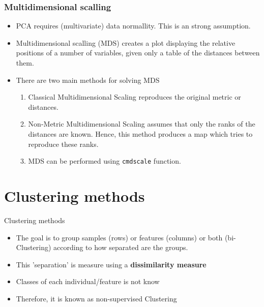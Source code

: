 \documentclass[10pt,xcolor=dvipsnames]{beamer}\usepackage[]{graphicx}\usepackage[]{color}
\begin{document}
\begin{frame}[plain]\frametitle{Multidimensional scalling}

\begin{itemize}
\item PCA requires (multivariate) data normallity. This is an strong assumption.
\item Multidimensional scalling (MDS) creates a plot displaying the relative positions of a number of 
variables, given only a table of the distances between them.
\item There are two main methods for solving MDS
\begin{enumerate}
\item Classical Multidimensional Scaling reproduces the original metric or distances. 
\item Non-Metric Multidimensional Scaling assumes that only the ranks of the distances are known. Hence, this method produces a map which tries to reproduce these ranks. 
\item  MDS can be performed using {\tt cmdscale} function.
 \end{enumerate}
\end{itemize}
\end{frame}





\section{Clustering methods}


\begin{frame}{Clustering methods}

\begin{itemize}
 \item The goal is to group samples (rows) or features (columns) or both (bi-Clustering)
  according to how separated are the groups.
 \item This 'separation' is measure using a \textbf{dissimilarity measure}
 \item Classes of each individual/feature is not know
 \item Therefore, it is known as non-supervised Clustering  
\end{itemize}

\end{frame}
\end{document}
